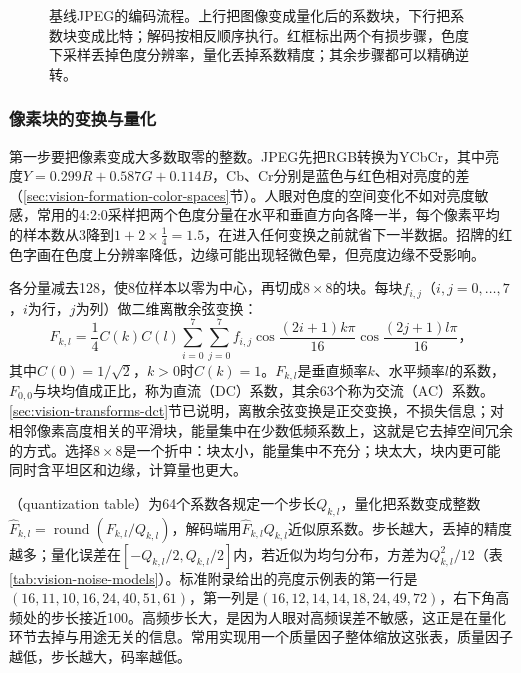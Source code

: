 \begin{figure}[tbp]
 \centering
 
 \caption{基线JPEG的编码流程。上行把图像变成量化后的系数块，下行把系数块变成比特；解码按相反顺序执行。红框标出两个有损步骤，色度下采样丢掉色度分辨率，量化丢掉系数精度；其余步骤都可以精确逆转。}
 \label{fig:vision-jpeg-pipeline}
\end{figure}

\subsubsection{像素块的变换与量化}
\label{sec:vision-restoration-jpeg-transform}

第一步要把像素变成大多数取零的整数。JPEG先把RGB转换为YCbCr，其中亮度$Y=0.299R+0.587G+0.114B$，Cb、Cr分别是蓝色与红色相对亮度的差（\ref{sec:vision-formation-color-spaces}节）。人眼对色度的空间变化不如对亮度敏感，常用的4:2:0采样把两个色度分量在水平和垂直方向各降一半，每个像素平均的样本数从3降到$1+2\times\frac14=1.5$，在进入任何变换之前就省下一半数据。招牌的红色字画在色度上分辨率降低，边缘可能出现轻微色晕，但亮度边缘不受影响。

各分量减去128，使8位样本以零为中心，再切成$8\times8$的块。每块$f_{i,j}$（$i,j=0,\dots,7$，$i$为行，$j$为列）做二维离散余弦变换：
\begin{equation}
 F_{k,l}=\frac14C(k)C(l)\sum_{i=0}^{7}\sum_{j=0}^{7}f_{i,j}
 \cos\frac{(2i+1)k\pi}{16}\cos\frac{(2j+1)l\pi}{16}\text{，}
 \label{eq:vision-jpeg-dct}
\end{equation}
其中$C(0)=1/\sqrt2$，$k>0$时$C(k)=1$。$F_{k,l}$是垂直频率$k$、水平频率$l$的系数，$F_{0,0}$与块均值成正比，称为直流（DC）系数，其余63个称为交流（AC）系数。\ref{sec:vision-transforms-dct}节已说明，离散余弦变换是正交变换，不损失信息；对相邻像素高度相关的平滑块，能量集中在少数低频系数上，这就是它去掉空间冗余的方式。选择$8\times8$是一个折中：块太小，能量集中不充分；块太大，块内更可能同时含平坦区和边缘，计算量也更大。

（quantization table）为64个系数各规定一个步长$Q_{k,l}$，量化把系数变成整数$\hat F_{k,l}=\operatorname{round}(F_{k,l}/Q_{k,l})$，解码端用$\hat F_{k,l}Q_{k,l}$近似原系数。步长越大，丢掉的精度越多；量化误差在$[-Q_{k,l}/2,Q_{k,l}/2]$内，若近似为均匀分布，方差为$Q_{k,l}^2/12$（表\ref{tab:vision-noise-models}）。标准附录给出的亮度示例表的第一行是$(16,11,10,16,24,40,51,61)$，第一列是$(16,12,14,14,18,24,49,72)$，右下角高频处的步长接近100。高频步长大，是因为人眼对高频误差不敏感，这正是在量化环节去掉与用途无关的信息。常用实现用一个质量因子整体缩放这张表，质量因子越低，步长越大，码率越低。

